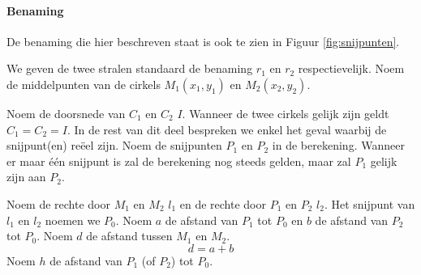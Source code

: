 \paragraph{Benaming}
De benaming die hier beschreven staat is ook te zien in Figuur \ref{fig:snijpunten}.

We geven de twee stralen standaard de benaming $r_1$ en $r_2$ respectievelijk.
Noem de middelpunten van de cirkels $M_1(x_1,y_1)$ en $M_2(x_2,y_2)$. 

Noem de doorsnede van $C_1$ en $C_2$ $I$. Wanneer de twee cirkels gelijk zijn geldt $C_1 = C_2 = I$.
In de rest van dit deel bespreken we enkel het geval waarbij de snijpunt(en) re\"eel zijn.
Noem de snijpunten $P_1$ en $P_2$ in de berekening.
Wanneer er maar \'e\'en snijpunt is zal de berekening nog steeds gelden, maar zal $P_1$ gelijk zijn aan $P_2$.

Noem de rechte door $M_1$ en $M_2$ $l_1$ en de rechte door $P_1$ en $P_2$ $l_2$.
Het snijpunt van $l_1$ en $l_2$ noemen we $P_0$.
Noem $a$ de afstand van $P_1$ tot $P_0$ en $b$ de afstand van $P_2$ tot $P_0$.
Noem $d$ de afstand tussen $M_1$ en $M_2$.
\[
d = a + b
\]
Noem $h$ de afstand van $P_1$ (of $P_2$) tot $P_0$.

